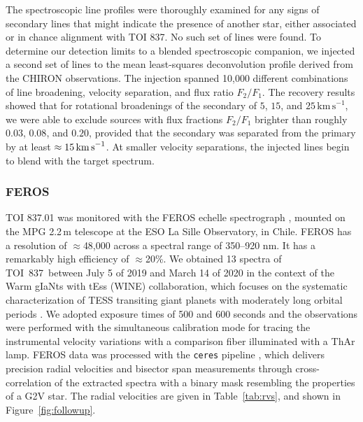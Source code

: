 \documentclass[12pt,twocolumn,tighten]{aastex63}
\newcommand{\tn}{TOI~837} %
\begin{document}
The spectroscopic line profiles were thoroughly examined for any signs
of secondary lines that might indicate the presence of another star,
either associated or in chance alignment with TOI 837. No such set of
lines were found. To determine our detection limits to a blended
spectroscopic companion, we injected a second set of lines to the mean
least-squares deconvolution profile derived from the CHIRON
observations. The injection spanned 10,000 different combinations of
line broadening, velocity separation, and flux
ratio $F_2/F_1$. The recovery results showed that for rotational
broadenings of the secondary of $5$, $15$,
and $25\,\mathrm{km\,s}^{-1}$, we were able to exclude sources with
flux fractions $F_2/F_1$ brighter than roughly $0.03$, $0.08$, and
$0.20$, provided that the secondary was separated from the primary by
at least $\approx 15\,{\rm km\,s}^{-1}$.  At smaller velocity
separations, the injected lines begin to blend with the target
spectrum.


\subsubsection{FEROS}
TOI 837.01 was monitored with the FEROS echelle spectrograph
\citep{kaufer_commissioning_1999}, mounted on the MPG 2.2$\,$m telescope
at the ESO La Sille Observatory, in Chile. FEROS has a resolution of
$\approx$48,000 across a spectral range of 350–920 nm. It has a
remarkably high efficiency of $\approx$20\%. We obtained 13 spectra of
\tn\ between July 5 of 2019 and March 14 of 2020 in the context of the
Warm gIaNts with tEss (WINE) collaboration, which focuses on the
systematic characterization of TESS transiting giant planets with
moderately long orbital periods \citep[{\it
e.g.},][]{brahm:2019,jordan:2020}.  We adopted exposure times of 500
and 600 seconds and the observations were performed with the
simultaneous calibration mode for tracing the instrumental velocity
variations with a comparison fiber illuminated with a ThAr lamp. FEROS
data was processed with the \texttt{ceres} pipeline
\citep{brahm_2017_ceres}, which delivers precision radial velocities
and bisector span measurements through cross-correlation of the
extracted spectra with a binary mask resembling the properties of a
G2V star. The radial velocities are given in Table~\ref{tab:rvs},
and shown in Figure~\ref{fig:followup}.
\end{document}
